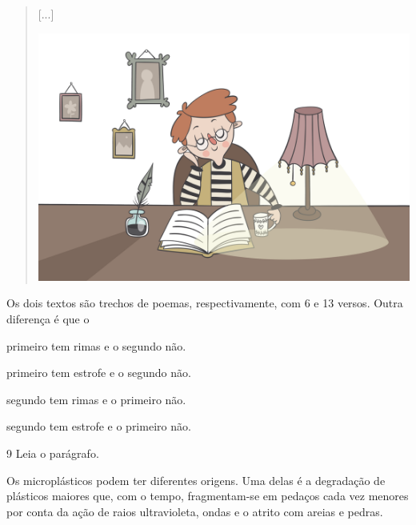 \begin{myquote}
\begin{verse}
{[}...{]}

\begin{center}
\includegraphics[width=.7\textwidth]{./media/image24c.png}
\end{center}

\end{verse}
\end{myquote}

Os dois textos são trechos de poemas, respectivamente, com 6 e 13
versos. Outra diferença é que o

\begin{escolha}
\item primeiro tem rimas e o segundo não.

\item primeiro tem estrofe e o segundo não.

\item segundo tem rimas e o primeiro não.

\item segundo tem estrofe e o primeiro não.
\end{escolha}


\num{9} Leia o parágrafo.

\begin{myquote}
Os microplásticos podem ter diferentes origens. Uma delas é a degradação
de plásticos maiores que, com o tempo, fragmentam-se em pedaços cada vez
menores por conta da ação de raios ultravioleta, ondas e o atrito com
areias e pedras.

\end{myquote}

